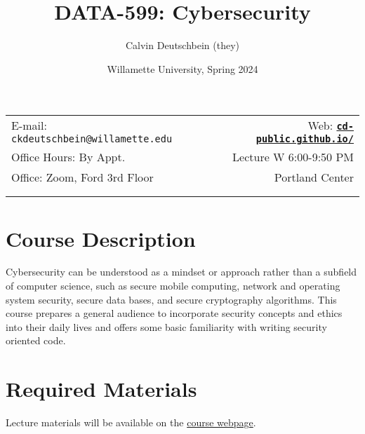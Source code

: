 \documentclass[11pt]{article}
\title{DATA-599: Cybersecurity}
\author{Calvin Deutschbein (they)}
\date{Willamette University, Spring 2024}
\newcommand{\blankline}{\quad\pagebreak[2]}
\begin{document}
\maketitle

\blankline

\begin{tabular*}{.93\textwidth}{@{\extracolsep{\fill}}lr}


E-mail: \texttt{ckdeutschbein@willamette.edu} & Web: \href{https://cd-public.github.io/courses/intro/151s22.html}{\tt\bf cd-public.github.io/}  \\

 Office Hours: By Appt.  &  Lecture W 6:00-9:50 PM \\

 Office: Zoom, Ford 3rd Floor & Portland Center\\
 & \\
&  \\
\hline
\end{tabular*}

\vspace{5 mm}


\section*{Course Description}

Cybersecurity can be understood as a mindset or approach rather than a subfield of computer science, such as secure mobile computing, network and operating system security, secure data bases, and secure cryptography algorithms. This course prepares a general audience to incorporate security concepts and ethics into their daily lives and offers some basic familiarity with writing security oriented code. 


\section*{Required Materials}

Lecture materials will be available on the \href{https://cd-public.github.io/courses/secs24}{course webpage}.


\end{document}
